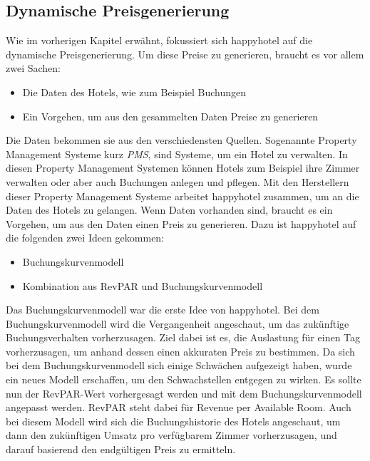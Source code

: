 \subsection{Dynamische Preisgenerierung}
\label{subsec:Preisgenerierung}
Wie im vorherigen Kapitel erwähnt, fokussiert sich happyhotel auf die dynamische Preisgenerierung. Um diese Preise zu generieren, braucht es vor allem zwei Sachen:
\begin{itemize}
    \item Die Daten des Hotels, wie zum Beispiel Buchungen
    \item Ein Vorgehen, um aus den gesammelten Daten Preise zu generieren
\end{itemize}

Die Daten bekommen sie aus den verschiedensten Quellen. Sogenannte Property Management Systeme kurz \emph{PMS}, sind Systeme, um ein Hotel zu verwalten. In diesen Property Management Systemen können Hotels zum Beispiel ihre Zimmer verwalten oder aber auch Buchungen anlegen und pflegen. Mit den Herstellern dieser Property Management Systeme arbeitet happyhotel zusammen, um an die Daten des Hotels zu gelangen. 
\newline
Wenn Daten vorhanden sind, braucht es ein Vorgehen, um aus den Daten einen Preis zu generieren. Dazu ist happyhotel auf die folgenden zwei Ideen gekommen:
\begin{itemize}
    \item Buchungskurvenmodell
    \item Kombination aus RevPAR und Buchungskurvenmodell
\end{itemize}

Das Buchungskurvenmodell war die erste Idee von happyhotel. Bei dem Buchungskurvenmodell wird die Vergangenheit angeschaut, um das zukünftige Buchungsverhalten vorherzusagen. Ziel dabei ist es, die Auslastung für einen Tag vorherzusagen, um anhand dessen einen akkuraten Preis zu bestimmen. 
\newline
\newline
Da sich bei dem Buchungskurvenmodell sich einige Schwächen aufgezeigt haben, wurde ein neues Modell erschaffen, um den Schwachstellen entgegen zu wirken. Es sollte nun der RevPAR-Wert vorhergesagt werden und mit dem Buchungskurvenmodell angepasst werden. RevPAR steht dabei für Revenue per Available Room. Auch bei diesem Modell wird sich die Buchungshistorie des Hotels angeschaut, um dann den zukünftigen Umsatz pro verfügbarem Zimmer vorherzusagen, und darauf basierend den endgültigen Preis zu ermitteln.